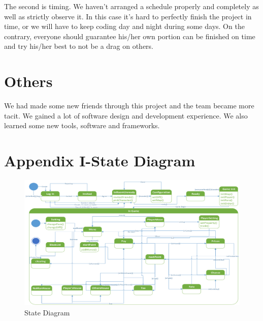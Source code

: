 \documentclass[a4paper,11pt]{article}
\begin{document}
The second is timing. We haven't arranged a schedule properly and completely as well as strictly observe it. In this case it's hard to perfectly finish the project in time, or we will have to keep coding day and night during some days. On the contrary, everyone should guarantee his/her own portion can be finished on time and try his/her best to not be a drag on others. 

\section{Others}
We had made some new friends through this project and the team became more tacit. We gained a lot of software design and development experience. We also learned some new tools, software and frameworks.



\section*{Appendix I-State Diagram}
\begin{figure}[H]
\includegraphics[scale=0.70]{image/state_diagram.png}
\caption{State Diagram}
\end{figure}
\end{document}
